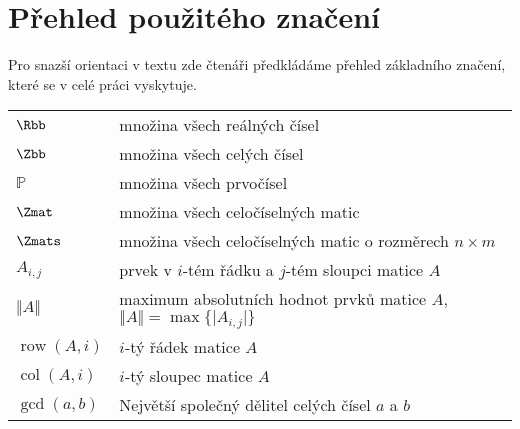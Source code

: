 \chapter*{Přehled použitého značení}

Pro snazší orientaci v textu zde čtenáři předkládáme přehled základního značení, které se v celé práci vyskytuje.
\begin{flushleft}
\begin{longtable}[l]{ll} %
  $\Rbb$                      & množina všech reálných čísel \\[1mm]
  $\Zbb$                      & množina všech celých čísel \\[1mm]
  $\mathbb{P}$                & množina všech prvočísel\\[1mm]
  $\Zmat$                     & množina všech celočíselných matic\\[1mm]
  $\Zmats$                    & množina všech celočíselných matic o rozměrech $ n \times m $\\[1mm]
  $A_{i, j}$			      & prvek v $ i $-tém řádku a $ j $-tém sloupci matice $ A $\\[1mm]
  $\Vert A \Vert$             & maximum absolutních hodnot prvků matice $ A $, $ \Vert A \Vert = \max{\{\vert A_{i, j} \vert \}}$\\[1mm]
  $\operatorname{row}(A, i) $ & $ i $-tý řádek matice $ A $\\[1mm]
  $\operatorname{col}(A, i) $ & $ i $-tý sloupec matice $ A $\\[1mm]
  $\operatorname{gcd}(a, b) $ & Největší společný dělitel celých čísel $ a $ a $ b $\\[1mm]

\end{longtable}
\end{flushleft}

\cleardoublepage
